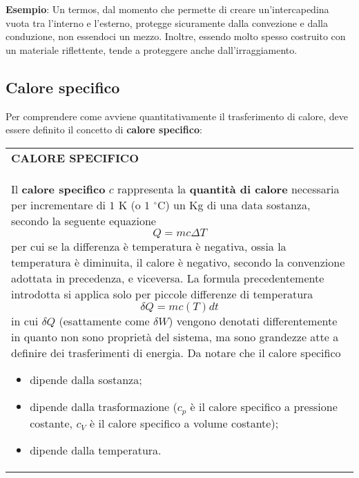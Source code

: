 \documentclass[a4paper]{extarticle}
\renewcommand\arraystretch{}
\begin{document}
\vspace{1em}
\noindent
\textbf{Esempio}: Un termos, dal momento che permette di creare un'intercapedina vuota tra l'interno e l'esterno, protegge sicuramente dalla convezione e dalla conduzione, non essendoci un mezzo. Inoltre, essendo molto spesso costruito con un materiale riflettente, tende a proteggere anche dall'irraggiamento.

\vspace{1em}
\subsection{Calore specifico}
Per comprendere come avviene quantitativamente il trasferimento di calore, deve essere definito il concetto di \textbf{calore specifico}:

\vspace{1em}
\setlength{\tabcolsep}{14pt}
\renewcommand{\arraystretch}{2}
\noindent
\begin{tabularx}{\textwidth}{@{}|P|@{}}
    \hline
    {\textbf{CALORE SPECIFICO}}\\
    \parbox{\linewidth}{Il \textbf{calore specifico} $c$ rappresenta la \textbf{quantità di calore} necessaria per incrementare di $1$ K (o $1$ $^\circ$C) un Kg di una data sostanza, secondo la seguente equazione
    \[\boxed{Q=m c \Delta T}\]
    per cui se la differenza è temperatura è negativa, ossia la temperatura è diminuita, il calore è negativo, secondo la convenzione adottata in precedenza, e viceversa.\\
    La formula precedentemente introdotta si applica solo per piccole differenze di temperatura
    \[\delta Q = m c(T) dt\]
    in cui $\delta Q$ (esattamente come $\delta W$) vengono denotati differentemente in quanto non sono proprietà del sistema, ma sono grandezze atte a definire dei trasferimenti di energia.
    Da notare che il calore specifico
    \begin{itemize}
      \item dipende dalla sostanza;
      \item dipende dalla trasformazione ($c_p$ è il calore specifico a pressione costante, $c_V$ è il calore specifico a volume costante);
      \item dipende dalla temperatura.
    \end{itemize}
    \vspace{1mm}}\\
    \hline
\end{tabularx}
\end{document}
